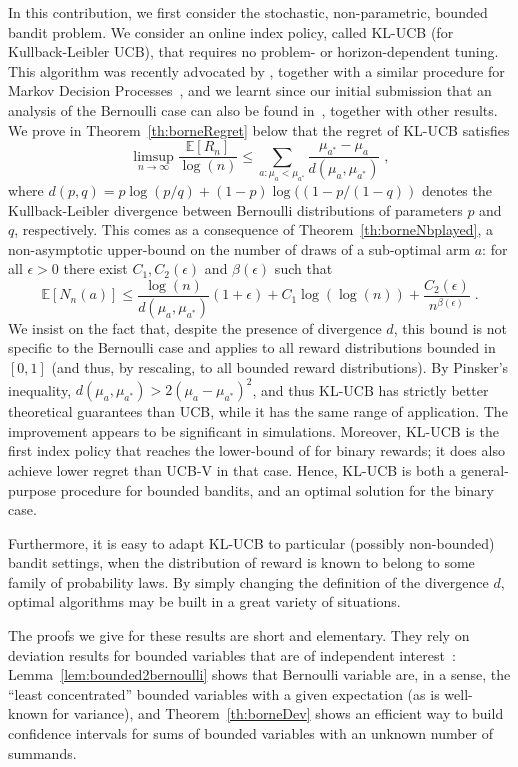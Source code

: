 \documentclass[wcp]{jmlr}
\newcommand{\E}{\mathbb{E}}
\newcommand{\1}{\mathbbm{1}}
\begin{document}
In this contribution, we first consider the stochastic, non-parametric, bounded bandit problem. We consider an online index policy, called KL-UCB (for Kullback-Leibler UCB), that requires no problem- or horizon-dependent tuning. This algorithm was recently advocated by \cite{filippi10}, together with a similar procedure for Markov Decision Processes~\citep{allerton10}, and we learnt since our initial submission that an analysis of the Bernoulli case can also be found in~\cite{MaillardMunosStoltz11klucb}, together with other results. We prove in Theorem~\ref{th:borneRegret} below
that the regret of KL-UCB satisfies
\[
 \limsup_{n\to\infty} \frac{\E[R_n]}{\log(n)} \leq \sum_{a:\mu_a<\mu_{a^*}}
\frac{\mu_{a^*}-\mu_a}{d(\mu_a, \mu_{a^*})}\;,
\]
where $d(p,q) = p\log(p/q)+(1-p)\log((1-p/(1-q))$ denotes the Kullback-Leibler
divergence between Bernoulli distributions of parameters $p$ and $q$, respectively. This comes as a consequence of Theorem~\ref{th:borneNbplayed}, a
non-asymptotic upper-bound on the number of draws of a sub-optimal arm $a$: for
all $\epsilon>0$ there exist $C_1, C_2(\epsilon)$ and $\beta(\epsilon)$ such
that
\[
 \E[N_n(a)] \leq \frac{\log(n)}{d(\mu_a, \mu_{a^*})}(1+\epsilon) + C_1
\log(\log(n)) + \frac{C_2(\epsilon)}{n^{\beta(\epsilon)}}\;.
\]
We insist on the
fact that, despite the presence of divergence $d$, this bound is not specific to
the Bernoulli case and applies to all reward distributions bounded in $[0,1]$
(and thus, by rescaling, to all bounded reward distributions). By Pinsker's
inequality, $d(\mu_a,\mu_{a^*}) > 2 (\mu_a-\mu_{a^*})^2$, and thus KL-UCB has strictly better theoretical guarantees than UCB, while it has the same range of application. The improvement appears to be significant in simulations. Moreover, KL-UCB is the first index policy that reaches the lower-bound of
\cite{LaiRobbins85bandits} for binary rewards;  it does also achieve lower 
regret than UCB-V in that case. Hence, KL-UCB is both a general-purpose
procedure for bounded bandits, and an optimal solution for the binary case.

Furthermore, it is easy to adapt KL-UCB to particular (possibly non-bounded) bandit settings, when the distribution of reward is known to belong to some family of probability laws. By simply changing the definition of the divergence $d$, optimal algorithms may be built in a great variety of situations.

The proofs we give for these results are short and elementary. They rely on
deviation results for bounded variables that are of independent interest~:
Lemma~\ref{lem:bounded2bernoulli} shows that Bernoulli variable are, in a
sense, the ``least concentrated'' bounded variables with a given expectation (as is
well-known for variance), and Theorem~\ref{th:borneDev} shows an efficient way
to build confidence intervals for sums of bounded variables with an unknown
number of summands. 
\end{document}
